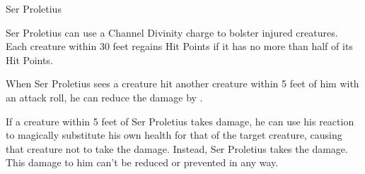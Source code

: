\begin{DndMonster}[width=\textwidth + 8pt]{Ser Proletius}
\begin{multicols}{2}
		Ser Proletius can use a Channel Divinity charge to bolster injured creatures. Each creature within 30 feet regains  Hit Points if it has no more than half of its Hit Points.
		
		When Ser Proletius sees a creature hit another creature within 5 feet of him with an attack roll, he can reduce the damage by .
		
		If a creature within 5 feet of Ser Proletius takes damage, he can use his reaction to magically substitute his own health for that of the target creature, causing that creature not to take the damage. Instead, Ser Proletius takes the damage. This damage to him can't be reduced or prevented in any way.
	\end{multicols}
\end{DndMonster}